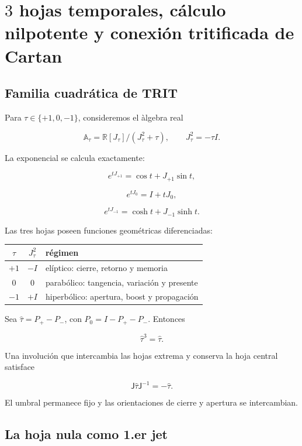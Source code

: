 \chapter{\(3\) hojas temporales, cálculo nilpotente y conexión tritificada de Cartan}
\label{chap:tres-hojas-variacion}

\section{Familia cuadr\'atica de TRIT}

Para \(\tau\in\{+1,0,-1\}\), consideremos el \`algebra real

\[
\mathbb A_\tau=\mathbb R[J_\tau]/(J_\tau^2+\tau),
\qquad
J_\tau^2=-\tau I.
\]

La exponencial se calcula exactamente:

\[
e^{tJ_{+1}}=\cos t+J_{+1}\sin t,
\]

\[
e^{tJ_0}=I+tJ_0,
\]

\[
e^{tJ_{-1}}=\cosh t+J_{-1}\sinh t.
\]

Las tres hojas poseen funciones geom\'etricas diferenciadas:

\begin{center}
\begin{tabular}{ccl}
\toprule
\(\tau\)&\(J_\tau^2\)&r\'egimen\\
\midrule
\(+1\)&\(-I\)&el\'iptico: cierre, retorno y memoria\\
\(0\)&\(0\)&parab\'olico: tangencia, variaci\'on y presente\\
\(-1\)&\(+I\)&hiperb\'olico: apertura, boost y propagaci\'on\\
\bottomrule
\end{tabular}
\end{center}

Sea \(\widehat\tau=P_+-P_-\), con \(P_0=I-P_+-P_-\). Entonces

\[
\widehat\tau^3=\widehat\tau.
\]

Una involuci\'on que intercambia las hojas extrema y conserva la hoja central
satisface

\[
\mathsf J\widehat\tau\mathsf J^{-1}=-\widehat\tau.
\]

El umbral permanece fijo y las orientaciones de cierre y apertura se
intercambian.

\section{La hoja nula como 1.er jet}

